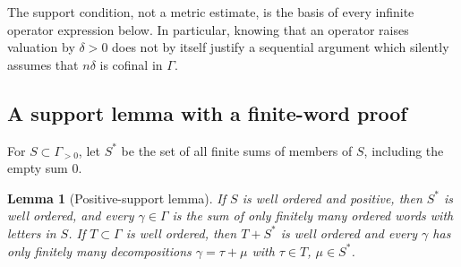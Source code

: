 \documentclass[11pt,a4paper]{article}
\numberwithin{equation}{section}
\newtheorem{lemma}[lemma]{Lemma}
\theoremstyle{definition}
\theoremstyle{remark}
\begin{document}
The support condition, not a metric estimate, is the basis of every infinite
operator expression below.  In particular, knowing that an operator raises
valuation by $\delta>0$ does not by itself justify a sequential argument
which silently assumes that $n\delta$ is cofinal in $\Gamma$.

\subsection{A support lemma with a finite-word proof}

For $S\subset\Gamma_{>0}$, let $S^*$ be the set of all finite sums of
members of $S$, including the empty sum $0$.

\begin{lemma}[Positive-support lemma]\label{lem:neumann}
If $S$ is well ordered and positive, then $S^*$ is well ordered, and every
$\gamma\in\Gamma$ is the sum of only finitely many ordered words with
letters in $S$.  If $T\subset\Gamma$ is well ordered, then $T+S^*$ is
well ordered and every $\gamma$ has only finitely many decompositions
$\gamma=\tau+\mu$ with $\tau\in T$, $\mu\in S^*$.
\end{lemma}
\end{document}
